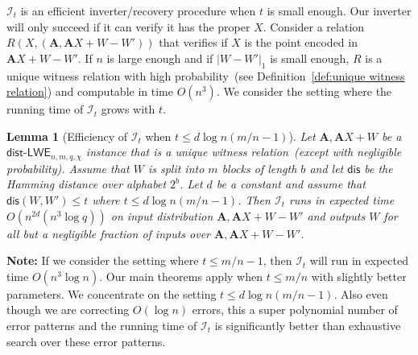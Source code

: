 \documentclass[11pt]{article}
\newcommand{\defref}[1]{\mbox{Definition~\ref{#1}}}
\newcommand{\lemref}[1]{\mbox{Lemma~\ref{#1}}}
\newcommand{\class}[1]{{\ensuremath{\mathsf{#1}}}}
\newcommand{\vect}[1]{\ensuremath{\textbf{#1}}}
\newcommand{\dis}{\ensuremath{\mathsf{dis}}}
\newcommand{\distLWE}{\ensuremath{\class{dist\mbox{-}LWE}}}
\newtheorem{lemma}[theorem]{Lemma}
\newcommand{\authnote}[2]{{\textcolor{red}{\textsf{#1 notes: }\textcolor{blue}{ #2}}\marginpar{\textcolor{red}{\textbf{!!!!!}}}}}
\newcommand{\authnote}[2]{}
\newcommand{\lnote}[1]{{\authnote{Leo}{#1}}}
\newcommand{\vA}{\vect{A}}
\begin{document}
$\mathcal{I}_t$ is an efficient inverter/recovery procedure when $t$ is small enough.  Our inverter will only succeed if it can verify it has the proper $X$. Consider a relation $R(X, (\vA, \vA X+W-W'))$ that verifies if $X$ is the point encoded in $\vA X+W-W'$.   If $n$ is large enough and if $|W-W'|_1$ is small enough, $R$ is a unique witness relation with high probability~(see \defref{def:unique witness relation}) and computable in time $O(n^3)$.
We consider the setting where the running time of $\mathcal{I}_t$ grows with $t$.
\begin{lemma}[Efficiency of $\mathcal{I}_t$ when $t\leq d\log n (m/n-1)$]
\label{lem:i t poly time}
Let $\vA, \vA X+W$ be a  $\distLWE_{n,m, q, \chi}$ instance that is a unique witness relation~(except with negligible probability).  Assume that $W$ is split into $m$ blocks of length $b$ and let $\dis$ be the Hamming distance over alphabet $2^b$.  Let $d$ be a constant and assume that $\dis(W, W')\leq t$ where $t\leq d\log n(m/n-1)$.  Then $\mathcal{I}_t$ runs in expected time $O(n^{2d}(n^3\log q))$ on input distribution $\vA, \vA X+W - W'$ and outputs $W$ for all but a negligible fraction of inputs over $\vA, \vA X+W - W'$.
\end{lemma}
\textbf{Note:} If we consider the setting where $t\leq m/n-1$, then $\mathcal{I}_t$ will run in expected time $O(n^3\log n)$.  Our main theorems apply when $t\leq m/n$ with slightly better parameters.  We concentrate on the setting $t\leq d\log n(m/n-1)$.  Also even though we are correcting $O(\log n)$ errors, this a super polynomial number of error patterns and the running time of $\mathcal{I}_t$ is significantly better than exhaustive search over these error patterns.
\end{document}
